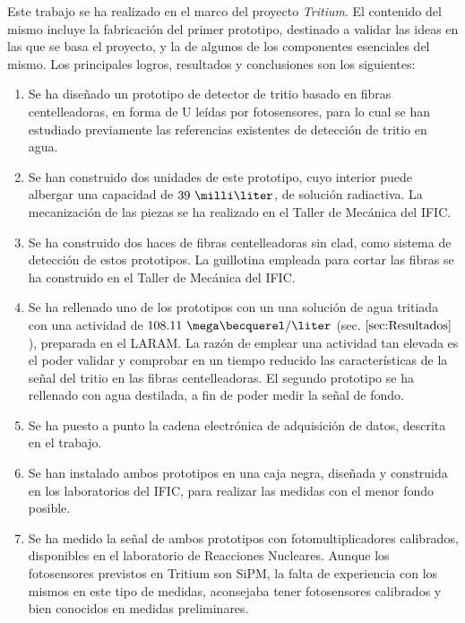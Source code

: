 


Este trabajo se ha realizado en el marco del proyecto \textit{Tritium}. El contenido del mismo incluye la fabricación del primer prototipo, destinado a validar las ideas en las que se basa el proyecto, y la de algunos de los componentes esenciales del mismo.  Los principales logros, resultados  y conclusiones son los siguientes:

\begin{enumerate}
\item Se ha diseñado un prototipo de detector de tritio basado en fibras centelleadoras, en forma de U leídas por fotosensores, para lo cual se han estudiado previamente las referencias existentes de detección de tritio en agua.

\item Se han  construido dos unidades de este prototipo,  cuyo interior puede albergar una capacidad de $39~\milli\liter$,  de solución radiactiva. La mecanización de las piezas se ha realizado en el Taller de  Mecánica del IFIC.

\item Se ha construido dos haces de fibras centelleadoras sin clad, como sistema de detección de estos prototipos.  La guillotina empleada para cortar las fibras se ha construido en el Taller de  Mecánica del IFIC.


\item Se ha rellenado uno de los prototipos con un una solución de agua tritiada con una actividad de $108.11~\mega\becquerel/\liter$ (sec. $\ref{sec:Resultados}$), preparada en el LARAM.  La  razón de emplear una actividad tan elevada es el poder validar y comprobar en un tiempo reducido las características de la señal  del tritio en las fibras centelleadoras. El segundo prototipo se ha rellenado con agua destilada, a fin de poder medir la señal de  fondo.

\item Se ha puesto a punto la cadena electrónica de adquisición de datos, descrita en el trabajo.

\item Se han instalado ambos prototipos en una caja negra, diseñada y construida en los laboratorios del IFIC, para realizar las medidas con el menor fondo posible.

\item Se ha medido la señal de ambos prototipos  con fotomultiplicadores calibrados, disponibles en el laboratorio de Reacciones Nucleares.  Aunque  los fotosensores  previstos en Tritium son SiPM, la falta de experiencia con los mismos en este tipo de medidas, aconsejaba tener fotosensores calibrados y bien conocidos en medidas preliminares.


\end{enumerate}
